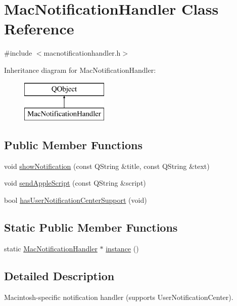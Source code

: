 \hypertarget{class_mac_notification_handler}{}\section{Mac\+Notification\+Handler Class Reference}
\label{class_mac_notification_handler}


{\ttfamily \#include $<$macnotificationhandler.\+h$>$}

Inheritance diagram for Mac\+Notification\+Handler\+:\begin{figure}[H]
\begin{center}
\leavevmode
\includegraphics[height=2.000000cm]{class_mac_notification_handler}
\end{center}
\end{figure}
\subsection*{Public Member Functions}
\begin{DoxyCompactItemize}
\item 
void \hyperlink{class_mac_notification_handler_abeb9b3a7c81397499fbb7e1d24610cd9}{show\+Notification} (const Q\+String \&title, const Q\+String \&text)
\item 
void \hyperlink{class_mac_notification_handler_a39051c00850f7b6cb644cdb60006dc2e}{send\+Apple\+Script} (const Q\+String \&script)
\item 
bool \hyperlink{class_mac_notification_handler_a132cba3b7df82afd3b07ca08599b94a5}{has\+User\+Notification\+Center\+Support} (void)
\end{DoxyCompactItemize}
\subsection*{Static Public Member Functions}
\begin{DoxyCompactItemize}
\item 
static \hyperlink{class_mac_notification_handler}{Mac\+Notification\+Handler} $\ast$ \hyperlink{class_mac_notification_handler_a8ba83adcb63db47e3f7a76a0afc02b9d}{instance} ()
\end{DoxyCompactItemize}


\subsection{Detailed Description}
Macintosh-\/specific notification handler (supports User\+Notification\+Center). 

